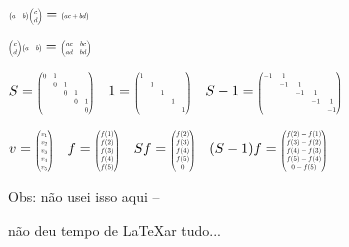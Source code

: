 \documentclass[oneside,12pt]{article}
\begin{document}
\msk

$\M{a&b} \M{c\\d} = \M{ac+bd}$

$\M{c\\d} \M{a&b} = \M{ac&bc\\ad&bd}$

\msk

$S = \M{0&1 \\ &0&1 \\ &&0&1 \\ &&&0&1 \\ &&&&0}
 \quad
 1 = \M{1 \\ &1 \\ &&1 \\ &&&1 \\ &&&&1}
 \quad
 S-1 = \M{-1&1 \\ &-1&1 \\ &&-1&1 \\ &&&-1&1 \\ &&&&-1}$

\msk

$v = \M{v_1\\v_2\\v_3\\v_4\\v_5\\}
 \quad
 f = \M{f(1)\\f(2)\\f(3)\\f(4)\\f(5)\\}
 \quad
 Sf = \M{f(2)\\f(3)\\f(4)\\f(5)\\0}
 \quad
 (S-1)f = \M{f(2)-f(1)\\f(3)-f(2)\\f(4)-f(3)\\f(5)-f(4)\\0-f(5)\\}
$

\bsk

Obs: não usei isso aqui --

não deu tempo de \LaTeX ar tudo...


\end{document}
